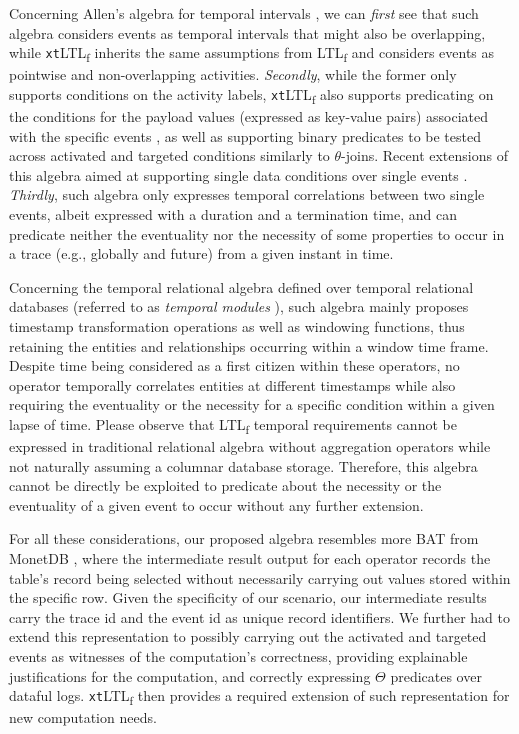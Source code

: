 \documentclass[sigconf]{acmart}
\begin{document}
Concerning Allen's algebra for temporal intervals \cite{10.1145/182.358434}, we can \textit{first} see that such algebra considers events as temporal intervals that might also be overlapping, while \texttt{xt}LTL\textsubscript{f} inherits the same assumptions from LTL\textsubscript{f} and considers events as pointwise and non-overlapping activities. \textit{Secondly}, while the former only supports conditions on the activity labels, \texttt{xt}LTL\textsubscript{f} also supports predicating on the conditions for the payload values (expressed as key-value pairs) associated with the specific events \cite{info14030173}, as well as supporting binary predicates to be tested across activated and targeted conditions similarly to $\theta$-joins. Recent extensions of this algebra aimed at supporting single data conditions over single events \cite{DBLP:books/sp/22/MurillasRA22}. \textit{Thirdly}, such algebra only expresses temporal correlations between two single events, albeit expressed with a duration and a termination time, and can predicate neither the eventuality nor the necessity of some properties to occur in a trace (e.g., globally and future) from a given instant in time.

Concerning the temporal relational algebra \cite{DBLP:conf/cikm/Wang95} defined over temporal relational databases (referred to as \textit{temporal modules} \cite{DBLP:journals/isci/WangJS95}),  such algebra mainly proposes timestamp transformation operations as well as windowing functions, thus retaining the entities and relationships occurring within a window time frame. Despite time being considered as a first citizen within these operators, no operator temporally correlates entities at different timestamps while also requiring the eventuality or the necessity for a specific condition within a given lapse of time. Please observe that LTL\textsubscript{f} temporal requirements cannot be expressed in traditional relational algebra without aggregation operators while not naturally assuming a columnar database storage. Therefore, this algebra cannot be directly be exploited to predicate about the necessity or the eventuality of a given event to occur without any further extension.

For all these considerations, our proposed algebra resembles more BAT from MonetDB \cite{IdreosGNMMK12,DBLP:journals/pvldb/BonczMK09}, where the intermediate result output for each operator records the table's record being selected without necessarily carrying out values stored within the specific row. Given the specificity of our scenario, our intermediate results carry the trace id and the event id as unique record identifiers. We further had to extend this representation to possibly carrying out the activated and targeted events as witnesses of the computation's correctness, providing explainable justifications for the computation, and correctly expressing $\Theta$ predicates over dataful logs. \texttt{xt}LTL\textsubscript{f} then provides a required extension of such representation for new computation needs.
\end{document}
